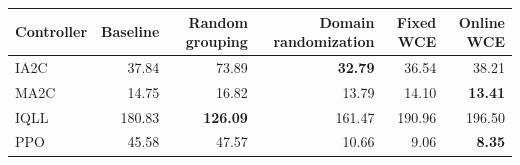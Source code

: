 \begin{tabular}{lrrrrr}
\hline
Controller & Baseline & Random grouping & Domain randomization & Fixed WCE & Online WCE \\
\hline
IA2C & 37.84 & 73.89 & \textbf{32.79} & 36.54 & 38.21 \\
MA2C & 14.75 & 16.82 & 13.79 & 14.10 & \textbf{13.41} \\
IQLL & 180.83 & \textbf{126.09} & 161.47 & 190.96 & 196.50 \\
PPO & 45.58 & 47.57 & 10.66 & 9.06 & \textbf{8.35} \\
\hline
\end{tabular}
